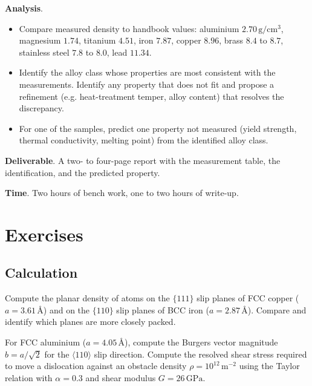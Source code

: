 \begin{project}
\textbf{Analysis}.

\begin{itemize}[leftmargin=*]
\item Compare measured density to handbook values: aluminium $2.70\,
  \text{g}/\text{cm}^3$, magnesium $1.74$, titanium $4.51$, iron
  $7.87$, copper $8.96$, brass $8.4$ to $8.7$, stainless steel
  $7.8$ to $8.0$, lead $11.34$.
\item Identify the alloy class whose properties are most consistent
  with the measurements. Identify any property that does not fit and
  propose a refinement (e.g. heat-treatment temper, alloy content)
  that resolves the discrepancy.
\item For one of the samples, predict one property not measured
  (yield strength, thermal conductivity, melting point) from the
  identified alloy class.
\end{itemize}

\textbf{Deliverable}. A two- to four-page report with the
measurement table, the identification, and the predicted property.

\textbf{Time}. Two hours of bench work, one to two hours of write-up.
\end{project}

\section{Exercises}

\subsection*{Calculation}

\begin{exercise}
Compute the planar density of atoms on the $\{111\}$ slip planes of
FCC copper ($a = 3.61\,\si{\angstrom}$) and on the $\{110\}$ slip
planes of BCC iron ($a = 2.87\,\si{\angstrom}$). Compare and identify
which planes are more closely packed.
\end{exercise}

\begin{exercise}
For FCC aluminium ($a = 4.05\,\si{\angstrom}$), compute the Burgers
vector magnitude $b = a/\sqrt{2}$ for the $\langle 110 \rangle$ slip
direction. Compute the resolved shear stress required to move a
dislocation against an obstacle density $\rho = 10^{12}\,\text{m}^{-2}$
using the Taylor relation with $\alpha = 0.3$ and shear modulus
$G = 26\,\text{GPa}$.
\end{exercise}

